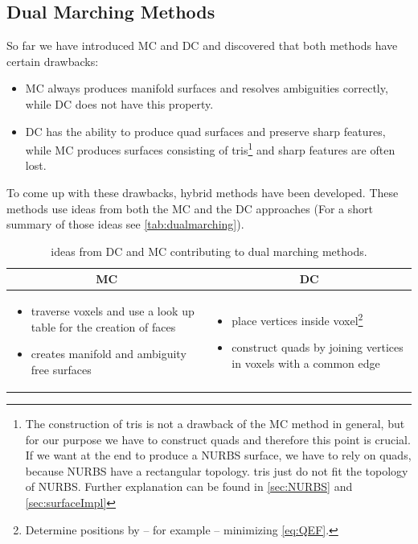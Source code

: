 \subsection{Dual Marching Methods}
So far we have introduced \ac{MC} and \ac{DC} and discovered that both methods have certain drawbacks:
\begin{itemize}
\item \ac{MC} always produces manifold surfaces and resolves ambiguities correctly, while \ac{DC} does not have this property.
\item \ac{DC} has the ability to produce \ac{quad} surfaces and preserve sharp features, while \ac{MC} produces surfaces consisting of \acp{tri}\footnote{The construction of \acp{tri} is not a drawback of the \ac{MC} method in general, but for our purpose we have to construct \acp{quad} and therefore this point is crucial. If we want at the end to produce a \ac{NURBS} surface, we have to rely on \acp{quad}, because \ac{NURBS} have a rectangular topology. \Acp{tri} just do not fit the topology of \ac{NURBS}. Further explanation can be found in \autoref{sec:NURBS} and \autoref{sec:surfaceImpl}} and sharp features are often lost.
\end{itemize}
To come up with these drawbacks, hybrid methods have been developed. These methods use ideas from both the \ac{MC} and the \ac{DC} approaches (For a short summary of those ideas see \autoref{tab:dualmarching}).
\begin{table}[H]
\begin{tabularx}{\textwidth}{X|X}
\multicolumn{1}{c|}{\acl{MC}} 
    & \multicolumn{1}{c}{\acl{DC}} 
\\
\hline
\begin{itemize}[ topsep = 0pt, leftmargin=1em]
\item traverse voxels and use a look up table for the creation of faces
\item creates manifold and ambiguity free surfaces
\end{itemize}
&
\begin{itemize}[ topsep = 0pt, leftmargin=1em]
\item place vertices inside voxel\footnote{Determine positions by -- for example -- minimizing \autoref{eq:QEF}.}
\item construct \acp{quad} by joining vertices in voxels with a common edge
\end{itemize}
\end{tabularx}
\caption{ideas from \ac{DC} and \ac{MC} contributing to dual marching methods.}
\label{tab:dualmarching}
\end{table}

